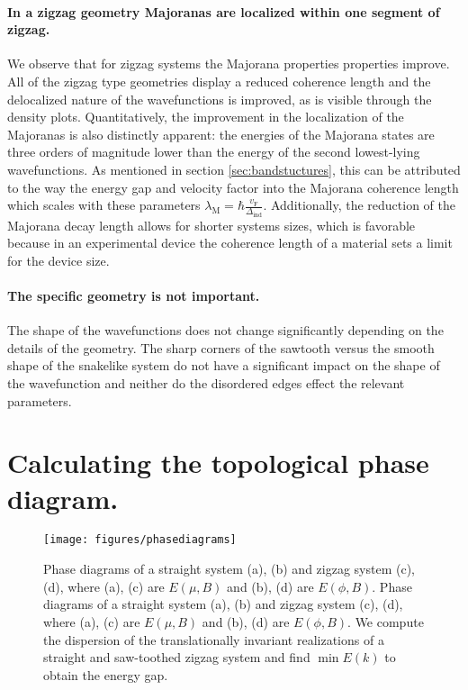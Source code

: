 \documentclass[english, twocolumn, 10pt, aps, superscriptaddress, floatfix, prb, citeautoscript]{revtex4-1}
\renewcommand{\comment}[2]{#2}
\renewcommand{\comment}{\paragraph}
\begin{document}
\comment{In a zigzag geometry Majoranas are localized within one segment of zigzag.}
We observe that for zigzag systems the Majorana properties properties improve.
All of the zigzag type geometries display a reduced coherence length and the delocalized nature of the wavefunctions is improved, as is visible through the density plots.
Quantitatively, the improvement in the localization of the Majoranas is also distinctly apparent: the energies of the Majorana states are three orders of magnitude lower than the energy of the second lowest-lying wavefunctions.
As mentioned in section \ref{sec:bandstuctures}, this can be attributed to the way the energy gap and velocity factor into the Majorana coherence length which scales with these parameters $\lambda_\textrm{M}=\hbar\frac{v_\textrm{F}}{\Delta_\textrm{ind}}$.
Additionally, the reduction of the Majorana decay length allows for shorter systems sizes, which is favorable because in an experimental device the coherence length of a material sets a limit for the device size.

\comment{The specific geometry is not important.}
The shape of the wavefunctions does not change significantly depending on the details of the geometry.
The sharp corners of the sawtooth versus the smooth shape of the snakelike system do not have a significant impact on the shape of the wavefunction and neither do the disordered edges effect the relevant parameters.

\section{Calculating the topological phase diagram.}

\begin{figure}[!htb]
\texttt{[image: figures/phasediagrams]}
\caption{Phase diagrams of a straight system (a), (b) and zigzag system (c), (d), where (a), (c) are $E(\mu, B)$ and (b), (d) are $E(\phi, B)$.
Phase diagrams of a straight system (a), (b) and zigzag system (c), (d), where (a), (c) are $E(\mu, B)$ and (b), (d) are $E(\phi, B)$.
We compute the dispersion of the translationally invariant realizations of a straight and saw-toothed zigzag system and find $\min{E(k)}$ to obtain the energy gap.
\label{fig:phasediagrams}}
\end{figure}
\end{document}

